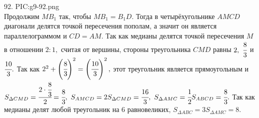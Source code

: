 92. {{PIC:g9-92.png}}\\
Продолжим $MB_1$ так, чтобы $MB_1=B_1D.$ Тогда в четырёхугольнике $AMCD$ диагонали делятся точкой пересечения пополам, а значит он является параллелограммом и $CD=AM.$ Так как медианы делятся точкой пересечения $M$ в отношении $2:1,$ считая от вершины, стороны треугольника $CMD$ равны $2,\ \cfrac{8}{3}$ и $\cfrac{10}{3}.$ Так как $2^2+\left(\cfrac{8}{3}\right)^2=\left(\cfrac{10}{3}\right)^2,$ этот треугольник является прямоугольным и  $S_{\Delta CMD}=\cfrac{2\cdot\cfrac{8}{3}}{2}=\cfrac{8}{3},\ S_{AMCD}=2S_{\Delta CMD}=\cfrac{16}{3},\ S_{\Delta AMC}=\cfrac{1}{2}S_{ABCD}=\cfrac{8}{3}.$ Так как медианы делят любой треугольник на 6 равновеликих, $S_{\Delta ABC}=3S_{\Delta AMC}=8.$\\
